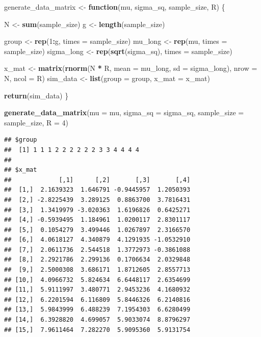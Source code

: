 \documentclass[
]{book}
\newenvironment{Shaded}{\begin{snugshade}}{\end{snugshade}}
\newcommand{\AttributeTok}[1]{\textcolor[rgb]{0.13,0.29,0.53}{#1}}
\newcommand{\ControlFlowTok}[1]{\textcolor[rgb]{0.13,0.29,0.53}{\textbf{#1}}}
\newcommand{\DecValTok}[1]{\textcolor[rgb]{0.00,0.00,0.81}{#1}}
\newcommand{\FunctionTok}[1]{\textcolor[rgb]{0.13,0.29,0.53}{\textbf{#1}}}
\newcommand{\NormalTok}[1]{#1}
\newcommand{\OtherTok}[1]{\textcolor[rgb]{0.56,0.35,0.01}{#1}}
\newcommand{\SpecialCharTok}[1]{\textcolor[rgb]{0.81,0.36,0.00}{\textbf{#1}}}
\begin{document}
\begin{Shaded}
\begin{Highlighting}[]
\NormalTok{generate\_data\_matrix }\OtherTok{\textless{}{-}} \ControlFlowTok{function}\NormalTok{(mu, sigma\_sq, sample\_size, R) \{}

\NormalTok{  N }\OtherTok{\textless{}{-}} \FunctionTok{sum}\NormalTok{(sample\_size) }
\NormalTok{  g }\OtherTok{\textless{}{-}} \FunctionTok{length}\NormalTok{(sample\_size) }
  
\NormalTok{  group }\OtherTok{\textless{}{-}} \FunctionTok{rep}\NormalTok{(}\DecValTok{1}\SpecialCharTok{:}\NormalTok{g, }\AttributeTok{times =}\NormalTok{ sample\_size) }
\NormalTok{  mu\_long }\OtherTok{\textless{}{-}} \FunctionTok{rep}\NormalTok{(mu, }\AttributeTok{times =}\NormalTok{ sample\_size)}
\NormalTok{  sigma\_long }\OtherTok{\textless{}{-}} \FunctionTok{rep}\NormalTok{(}\FunctionTok{sqrt}\NormalTok{(sigma\_sq), }\AttributeTok{times =}\NormalTok{ sample\_size) }

\NormalTok{  x\_mat }\OtherTok{\textless{}{-}} \FunctionTok{matrix}\NormalTok{(}\FunctionTok{rnorm}\NormalTok{(N }\SpecialCharTok{*}\NormalTok{ R, }\AttributeTok{mean =}\NormalTok{ mu\_long, }\AttributeTok{sd =}\NormalTok{ sigma\_long),}
                  \AttributeTok{nrow =}\NormalTok{ N, }\AttributeTok{ncol =}\NormalTok{ R)}
\NormalTok{  sim\_data }\OtherTok{\textless{}{-}} \FunctionTok{list}\NormalTok{(}\AttributeTok{group =}\NormalTok{ group, }\AttributeTok{x\_mat =}\NormalTok{ x\_mat)}
    
  \FunctionTok{return}\NormalTok{(sim\_data)}
\NormalTok{\}}

\FunctionTok{generate\_data\_matrix}\NormalTok{(}\AttributeTok{mu =}\NormalTok{ mu, }\AttributeTok{sigma\_sq =}\NormalTok{ sigma\_sq,}
                     \AttributeTok{sample\_size =}\NormalTok{ sample\_size, }\AttributeTok{R =} \DecValTok{4}\NormalTok{)}
\end{Highlighting}
\end{Shaded}

\begin{verbatim}
## $group
##  [1] 1 1 1 2 2 2 2 2 2 3 3 4 4 4 4
## 
## $x_mat
##             [,1]      [,2]       [,3]       [,4]
##  [1,]  2.1639323  1.646791 -0.9445957  1.2050393
##  [2,] -2.8225439  3.289125  0.8863700  3.7816431
##  [3,]  1.3419979 -3.020363  1.6196826  0.6425271
##  [4,] -0.5939495  1.184961  1.0200117  2.8301117
##  [5,]  0.1054279  3.499446  1.0267897  2.3166570
##  [6,]  4.0618127  4.340879  4.1291935 -1.0532910
##  [7,]  2.0611736  2.544518  1.3772973 -0.3861088
##  [8,]  2.2921786  2.299136  0.1706634  2.0329848
##  [9,]  2.5000308  3.686171  1.8712605  2.8557713
## [10,]  4.0966732  5.824634  6.6448117  2.6354699
## [11,]  5.9111997  3.480771  2.9453236  4.1680932
## [12,]  6.2201594  6.116809  5.8446326  6.2140816
## [13,]  5.9843999  6.488239  7.1954303  6.6280499
## [14,]  6.3928820  4.699057  5.9033074  8.8796297
## [15,]  7.9611464  7.282270  5.9095360  5.9131754
\end{verbatim}
\end{document}
